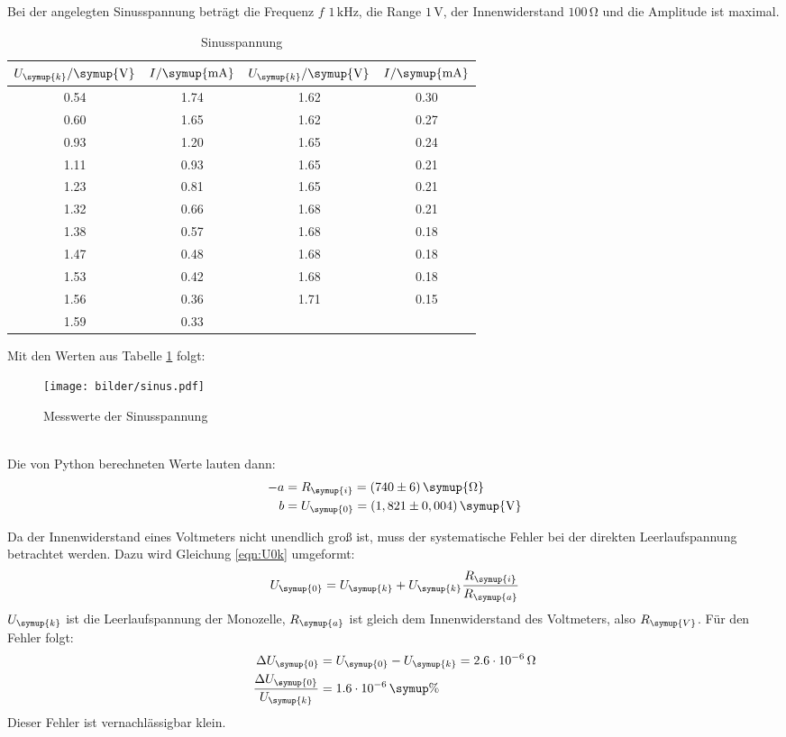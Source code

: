 Bei der angelegten Sinusspannung beträgt die Frequenz $f$ $1\,\si{\kilo\hertz}$,
die Range $1\,\si{\volt}$, der Innenwiderstand $100\,\si{\ohm}$ und die Amplitude ist maximal.
\begin{table}[H]
  \centering
  \begin{tabular}{c c c c}
    \toprule
    $U_{\symup{k}}/\symup{\si{\volt}}$ & $I/\symup{\si{\milli\ampere}}$  &
    $U_{\symup{k}}/\symup{\si{\volt}}$ & $I/\symup{\si{\milli\ampere}}$  \\
    \midrule
    0.54   &  1.74  &  1.62  &  0.30  \\
    0.60   &  1.65  &  1.62  &  0.27  \\
    0.93   &  1.20  &  1.65  &  0.24  \\
    1.11   &  0.93  &  1.65  &  0.21  \\
    1.23   &  0.81  &  1.65  &  0.21  \\
    1.32   &  0.66  &  1.68  &  0.21  \\
    1.38   &  0.57  &  1.68  &  0.18  \\
    1.47   &  0.48  &  1.68  &  0.18  \\
    1.53   &  0.42  &  1.68  &  0.18  \\
    1.56   &  0.36  &  1.71  &  0.15  \\
    1.59   &  0.33  &  \hrulefill  & \hrulefill  \\
    \bottomrule
  \end{tabular}
  \caption{Sinusspannung}
  \label{tab:sin}
\end{table}
Mit den Werten aus Tabelle \ref{tab:sin} folgt:
\begin{figure}[h]
  \centering
  \texttt{[image: bilder/sinus.pdf]}
  \caption{Messwerte der Sinusspannung}
  \label{fig:si}
\end{figure}
\\
Die von Python berechneten Werte lauten dann:
\begin{align*}
   -a &= R_\symup{i} = (740 \pm 6)\, \symup{\si{\ohm}} \\
   b &= U_\symup{0} = (1,821 \pm 0,004)\,\symup{\si{\volt}}
\end{align*}

Da der Innenwiderstand eines Voltmeters nicht unendlich groß ist, muss der systematische
Fehler bei der direkten Leerlaufspannung betrachtet werden. Dazu wird Gleichung
\eqref{eqn:U0k} umgeformt:
\begin{equation}
  U_\symup{0} = U_\symup{k} + U_\symup{k} \frac{R_\symup{i}}{R_\symup{a}}
\end{equation}
$U_\symup{k}$ ist die Leerlaufspannung der Monozelle, $R_\symup{a}$ ist gleich dem
Innenwiderstand des Voltmeters, also $R_\symup{V}$.
Für den Fehler folgt:
\begin{align*}
  \Delta U_\symup{0} &= U_\symup{0} - U_\symup{k} = 2.6 \cdot 10^{-6} \,\si{\ohm} \\
  \frac{\Delta U_\symup{0}}{U_\symup{k}} &= 1.6 \cdot 10^{-6} \, \symup{\%}
\end{align*}
Dieser Fehler ist vernachlässigbar klein.

